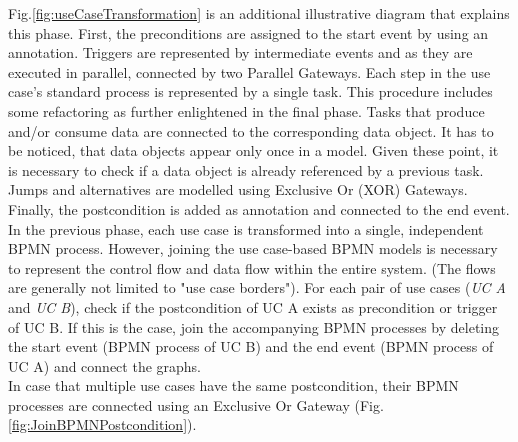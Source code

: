 \noindent
Fig.\ref{fig:useCaseTransformation} is an additional illustrative diagram that explains this phase. First, the preconditions are assigned to the start event by using an annotation. Triggers are represented by intermediate events and as they are executed in parallel, connected by two Parallel Gateways. Each step in the use case's standard process is represented by a single task. This procedure includes some refactoring as further enlightened in the final phase. Tasks that produce and/or consume data are connected to the corresponding data object. It has to be noticed, that data objects appear only once in a model. Given these point, it is necessary to check if a data object is already referenced by a previous task. Jumps and alternatives are modelled using Exclusive Or (XOR) Gateways. Finally, the postcondition is added as annotation and connected to the end event. \\
In the previous phase, each use case is transformed into a single, independent BPMN process. However, joining the use case-based BPMN models is necessary to represent the control flow and data flow within the entire system. (The flows are generally not limited to "use case borders"). For each pair of use cases (\textit{UC A} and \textit{UC B}), check if the postcondition of UC A exists as precondition or trigger of UC B. If this is the case, join the accompanying BPMN processes by deleting the start event (BPMN process of UC B) and the end event (BPMN process of UC A) and connect the graphs. \\
In case that multiple use cases have the same postcondition, their BPMN processes are connected using an Exclusive Or Gateway (Fig.\ref{fig:JoinBPMNPostcondition}). 

